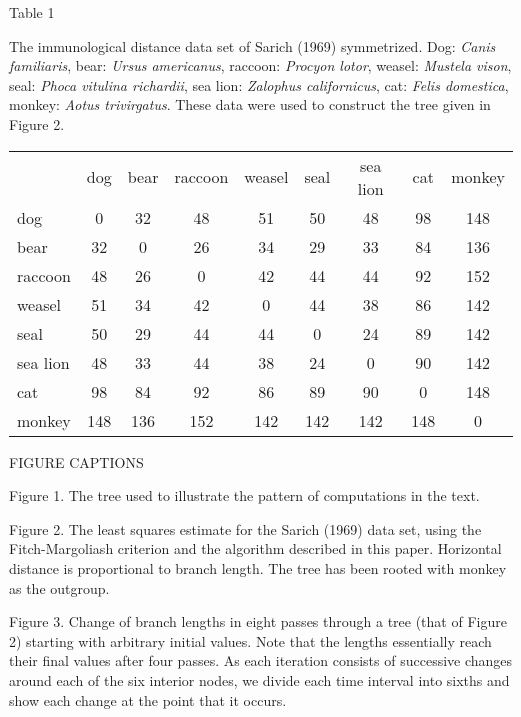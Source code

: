 \documentclass[12pt]{article}
\begin{document}
\centerline{\sc Table 1}

The immunological distance data set of Sarich (1969) symmetrized.
Dog: {\it Canis familiaris}, bear: {\it Ursus americanus}, raccoon: {\it Procyon lotor},
weasel: {\it Mustela vison}, seal: {\it Phoca vitulina richardii}, sea lion:
{\it Zalophus californicus}, cat: {\it Felis domestica}, monkey: {\it Aotus
trivirgatus}.
These data were used to construct the tree given in Figure 2.
\bigskip

\bigskip

\begin{tabular}{l c c c c c c c c}
               &dog    &bear  &raccoon  &weasel   &seal  &sea lion  &cat  &monkey\\
dog             &0      &32      &48      &51      &50      &48      &98     &148\\
bear           &32       &0      &26      &34      &29      &33      &84     &136\\
raccoon        &48      &26       &0      &42      &44      &44      &92     &152\\
weasel         &51      &34      &42       &0      &44      &38      &86     &142\\
seal           &50      &29      &44      &44       &0      &24      &89     &142\\
sea lion       &48      &33      &44      &38      &24       &0      &90     &142\\
cat            &98      &84      &92      &86      &89      &90       &0     &148\\
monkey     &   148  &   136  &   152  &   142  &   142  &   142 &    148   &    0
\end{tabular}
\newpage
\centerline{\sc FIGURE CAPTIONS}
\bigskip

\noindent
{\sc Figure 1.}  The tree used to illustrate the pattern of computations in the
text.
\bigskip

\noindent
{\sc Figure 2.}  The least squares estimate for the Sarich (1969) data set, using
the Fitch-Margoliash criterion and the algorithm described in this paper.
Horizontal distance is proportional to branch length.  The tree has been
rooted with monkey as the outgroup.
\bigskip

\noindent
{\sc Figure 3.}  Change of branch lengths in eight passes through a tree (that of
Figure 2) starting with arbitrary initial values.  Note that the lengths
essentially reach their final values after four passes.  As each iteration
consists of successive changes around each of the six interior nodes, we
divide each time interval into sixths and show each change at the point
that it occurs.
\bigskip
\end{document}
